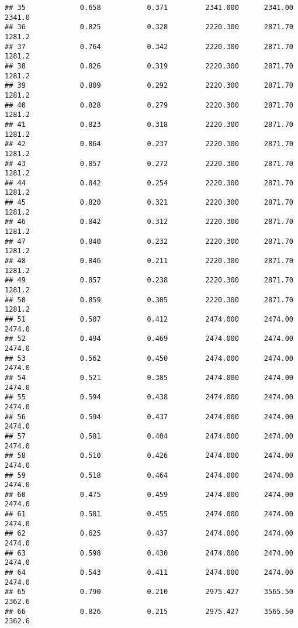 \documentclass[
]{article}
\begin{document}
\begin{verbatim}
## 35             0.658           0.371         2341.000      2341.00       2341.0
## 36             0.825           0.328         2220.300      2871.70       1281.2
## 37             0.764           0.342         2220.300      2871.70       1281.2
## 38             0.826           0.319         2220.300      2871.70       1281.2
## 39             0.809           0.292         2220.300      2871.70       1281.2
## 40             0.828           0.279         2220.300      2871.70       1281.2
## 41             0.823           0.318         2220.300      2871.70       1281.2
## 42             0.864           0.237         2220.300      2871.70       1281.2
## 43             0.857           0.272         2220.300      2871.70       1281.2
## 44             0.842           0.254         2220.300      2871.70       1281.2
## 45             0.820           0.321         2220.300      2871.70       1281.2
## 46             0.842           0.312         2220.300      2871.70       1281.2
## 47             0.840           0.232         2220.300      2871.70       1281.2
## 48             0.846           0.211         2220.300      2871.70       1281.2
## 49             0.857           0.238         2220.300      2871.70       1281.2
## 50             0.859           0.305         2220.300      2871.70       1281.2
## 51             0.507           0.412         2474.000      2474.00       2474.0
## 52             0.494           0.469         2474.000      2474.00       2474.0
## 53             0.562           0.450         2474.000      2474.00       2474.0
## 54             0.521           0.385         2474.000      2474.00       2474.0
## 55             0.594           0.438         2474.000      2474.00       2474.0
## 56             0.594           0.437         2474.000      2474.00       2474.0
## 57             0.581           0.404         2474.000      2474.00       2474.0
## 58             0.510           0.426         2474.000      2474.00       2474.0
## 59             0.518           0.464         2474.000      2474.00       2474.0
## 60             0.475           0.459         2474.000      2474.00       2474.0
## 61             0.581           0.455         2474.000      2474.00       2474.0
## 62             0.625           0.437         2474.000      2474.00       2474.0
## 63             0.598           0.430         2474.000      2474.00       2474.0
## 64             0.543           0.411         2474.000      2474.00       2474.0
## 65             0.790           0.210         2975.427      3565.50       2362.6
## 66             0.826           0.215         2975.427      3565.50       2362.6

\end{verbatim}
\end{document}
